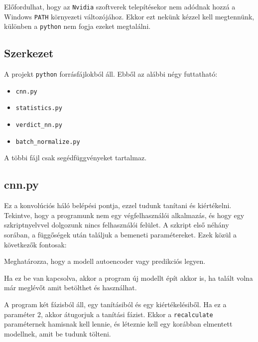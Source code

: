 Előfordulhat, hogy az \texttt{Nvidia} szoftverek telepítésekor nem adódnak hozzá a 
Windows \texttt{PATH} környezeti változójához. Ekkor ezt nekünk kézzel kell megtennünk,
különben a \texttt{python} nem fogja ezeket megtalálni.


\subsection{Szerkezet}

A projekt \texttt{python} forrásfájlokból áll. Ebből az alábbi négy futtatható:


\begin{itemize}
	\item \texttt{cnn.py}
	\item \texttt{statistics.py}
	\item \texttt{verdict\_nn.py}
	\item \texttt{batch\_normalize.py}

\end{itemize}

A többi fájl csak segédfüggvényeket tartalmaz.

\subsection{cnn.py}

Ez a konvolúciós háló belépési pontja, ezzel tudunk tanítani és kiértékelni. Tekintve, hogy 
a programunk nem egy végfelhasználói alkalmazás, és hogy egy szkriptnyelvvel dolgozunk nincs 
felhasználói felület. A szkript első néhány sorában, a függőségek után találjuk a bemeneti 
paramétereket. Ezek közül a következők fontosak:


Meghatározza, hogy a modell autoencoder vagy predikciós legyen.




Ha ez be van kapcsolva, akkor a program új modellt épít akkor is, ha talált volna 
már meglévőt amit betölthet és használhat.



A program két fázisból áll, egy tanításiból és egy kiértékelésiből. Ha ez a paraméter
$ 2 $, akkor átugorjuk a tanítási fázist. Ekkor a \texttt{recalculate} paraméternek
hamisnak kell lennie, és léteznie kell egy korábban elmentett modellnek, amit be
tudunk tölteni.




